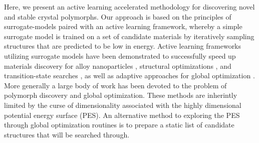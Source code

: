 %
%



%
Here, we present an active learning accelerated methodology for discovering novel and stable crystal polymorphs.
%
Our approach is based on the principles of surrogate-models paired with an active learning framework,
whereby a simple surrogate model is trained on a set of candidate materials by iteratively sampling structures that are predicted to be low in energy.
%
Active learning frameworks utilizing surrogate models have been demonstrated to successfully speed up materials discovery for alloy nanoparticles \cite{Jennings2019}, structural optimizations \cite{hansen2019atomistic}, and transition-state searches \cite{torres2019low}, as well as adaptive approaches for global optimization \cite{VanDenBossche2018}.
%
More generally a large body of work has been devoted to the problem of polymorph discovery and global optimization.
%
These methods are inherintly limited by the curse of dimensionality associated with the highly dimensional potential energy surface (PES).
%
An alternative method to exploring the PES through global optimization routines is to prepare a static list of candidate structures that will be searched through.
